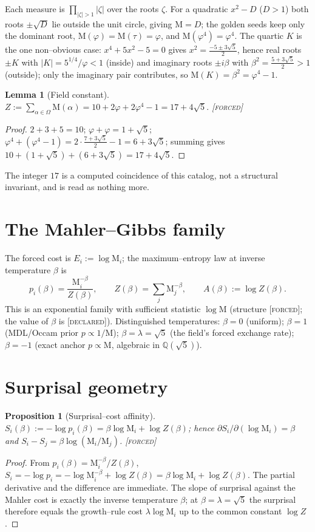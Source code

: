 \documentclass[11pt]{article}
\newtheorem{proposition}[theorem]{Proposition}
\newtheorem{lemma}[theorem]{Lemma}
\theoremstyle{definition}
\newcommand{\ph}{\varphi}
\newcommand{\Q}{\mathbb{Q}}
\newcommand{\Mah}{\mathrm{M}}
\newcommand{\forcedtag}{{\scshape [forced]}}
\newcommand{\declaredtag}{{\scshape [declared]}}
\begin{document}
Each measure is $\prod_{|\zeta|>1}|\zeta|$ over the roots $\zeta$. For a quadratic $x^2-D$ ($D>1$)
both roots $\pm\sqrt D$ lie outside the unit circle, giving $\Mah=D$; the golden seeds keep only the
dominant root, $\Mah(\ph)=\Mah(\tau)=\ph$, and $\Mah(\ph^4)=\ph^4$. The quartic $K$ is the one
non--obvious case: $x^4+5x^2-5=0$ gives $x^2=\tfrac{-5\pm3\sqrt5}{2}$, hence real roots $\pm K$ with
$|K|=5^{1/4}/\ph<1$ (inside) and imaginary roots $\pm i\beta$ with $\beta^2=\tfrac{5+3\sqrt5}{2}>1$
(outside); only the imaginary pair contributes, so $\Mah(K)=\beta^2=\ph^4-1$.

\begin{lemma}[Field constant]\label{lem:Z}
$Z:=\sum_{\alpha\in\Omega}\Mah(\alpha)=10+2\ph+2\ph^4-1=17+4\sqrt5.$ \forcedtag
\end{lemma}
\begin{proof}
$2+3+5=10$; $\ph+\ph=1+\sqrt5$; $\ph^4+(\ph^4-1)=2\cdot\tfrac{7+3\sqrt5}{2}-1=6+3\sqrt5$; summing
gives $10+(1+\sqrt5)+(6+3\sqrt5)=17+4\sqrt5$.
\end{proof}
The integer $17$ is a computed coincidence of this catalog, not a structural invariant, and is read
as nothing more.

\section{The Mahler--Gibbs family}
The forced cost is $E_i:=\log\Mah_i$; the maximum--entropy law at inverse temperature $\beta$ is
\[
p_i(\beta)=\frac{\Mah_i^{-\beta}}{Z(\beta)},\qquad Z(\beta)=\sum_j\Mah_j^{-\beta},\qquad
A(\beta):=\log Z(\beta).
\]
This is an exponential family with sufficient statistic $\log\Mah$ (structure \forcedtag; the value
of $\beta$ is \declaredtag). Distinguished temperatures: $\beta=0$ (uniform); $\beta=1$ (MDL/Occam
prior $p\propto1/\Mah$); $\beta=\lambda=\sqrt5$ (the field's forced exchange rate); $\beta=-1$
(exact anchor $p\propto\Mah$, algebraic in $\Q(\sqrt5)$).

\section{Surprisal geometry}
\begin{proposition}[Surprisal--cost affinity]\label{prop:affine}
$S_i(\beta):=-\log p_i(\beta)=\beta\log\Mah_i+\log Z(\beta)$; hence
$\partial S_i/\partial(\log\Mah_i)=\beta$ and $S_i-S_j=\beta\log(\Mah_i/\Mah_j)$. \forcedtag
\end{proposition}
\begin{proof}
From $p_i(\beta)=\Mah_i^{-\beta}/Z(\beta)$,
$S_i=-\log p_i=-\log\Mah_i^{-\beta}+\log Z(\beta)=\beta\log\Mah_i+\log Z(\beta)$. The partial
derivative and the difference are immediate. The slope of surprisal against the Mahler cost is
exactly the inverse temperature $\beta$; at $\beta=\lambda=\sqrt5$ the surprisal therefore equals the
growth--rule cost $\lambda\log\Mah_i$ up to the common constant $\log Z$.
\end{proof}
\end{document}
